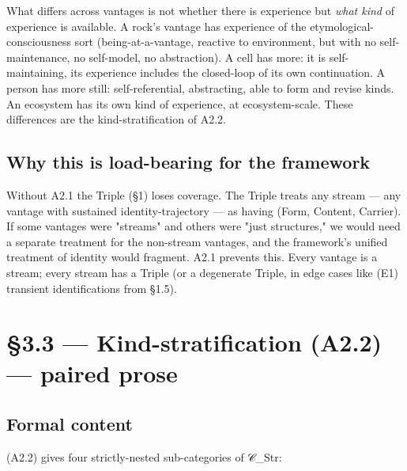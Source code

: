 \documentclass[11pt, openany]{book}
\newcommand{\sectionbreak}{\clearpage}
\begin{document}
What differs across vantages is not whether there is experience but \textit{what kind} of experience is available. A rock's vantage has experience of the etymological-consciousness sort (being-at-a-vantage, reactive to environment, but with no self-maintenance, no self-model, no abstraction). A cell has more: it is self-maintaining, its experience includes the closed-loop of its own continuation. A person has more still: self-referential, abstracting, able to form and revise kinds. An ecosystem has its own kind of experience, at ecosystem-scale. These differences are the kind-stratification of A2.2.

\subsection{Why this is load-bearing for the framework}

Without A2.1 the Triple (§1) loses coverage. The Triple treats any stream --- any vantage with sustained identity-trajectory --- as having (Form, Content, Carrier). If some vantages were "streams" and others were "just structures," we would need a separate treatment for the non-stream vantages, and the framework's unified treatment of identity would fragment. A2.1 prevents this. Every vantage is a stream; every stream has a Triple (or a degenerate Triple, in edge cases like (E1) transient identifications from §1.5).

\sectionbreak

\section{§3.3 --- Kind-stratification (A2.2) --- paired prose}

\subsection{Formal content}

(A2.2) gives four strictly-nested sub-categories of 𝒞\_\allowbreak{}Str:
\end{document}
